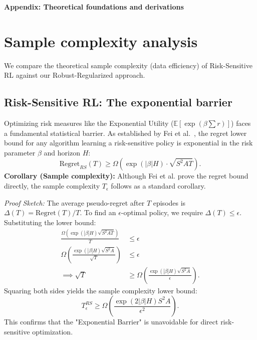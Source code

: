 \newpage
\appendix
\onecolumn
\begin{center}
    {\Large \textbf{Appendix: Theoretical foundations and derivations}}
\end{center}
\vspace{0.5cm}

\section{Sample complexity analysis}
\label{app:complexity}
We compare the theoretical sample complexity (data efficiency) of Risk-Sensitive RL against our Robust-Regularized approach.

\subsection{Risk-Sensitive RL: The exponential barrier}
Optimizing risk measures like the Exponential Utility ($\mathbb{E}[\exp(\beta \sum r)]$) faces a fundamental statistical barrier. As established by Fei et al.~\cite{Fei2020RiskSensitive}, the regret lower bound for any algorithm learning a risk-sensitive policy is exponential in the risk parameter $\beta$ and horizon $H$:
\begin{equation}
    \text{Regret}_{RS}(T) \ge \Omega(\exp(|\beta|H) \cdot \sqrt{S^2 A T}).
\end{equation}
\textbf{Corollary (Sample complexity):}
Although Fei et al. prove the regret bound directly, the sample complexity $T_\epsilon$ follows as a standard corollary. 

\textit{Proof Sketch:} The average pseudo-regret after $T$ episodes is $\Delta(T) = \text{Regret}(T)/T$. To find an $\epsilon$-optimal policy, we require $\Delta(T) \le \epsilon$. Substituting the lower bound:
\begin{align}
    \frac{\Omega(\exp(|\beta|H) \sqrt{S^2 A T})}{T} &\le \epsilon \nonumber \\
    \Omega\left( \frac{\exp(|\beta|H) \sqrt{S^2 A}}{\sqrt{T}} \right) &\le \epsilon \nonumber \\
    \implies \sqrt{T} &\ge \Omega\left( \frac{\exp(|\beta|H) \sqrt{S^2 A}}{\epsilon} \right).
\end{align}
Squaring both sides yields the sample complexity lower bound:
\begin{equation}
    T_\epsilon^{RS} \ge \Omega\left( \frac{\exp(2|\beta|H) S^2 A}{\epsilon^2} \right).
\end{equation}
This confirms that the "Exponential Barrier" is unavoidable for direct risk-sensitive optimization.

